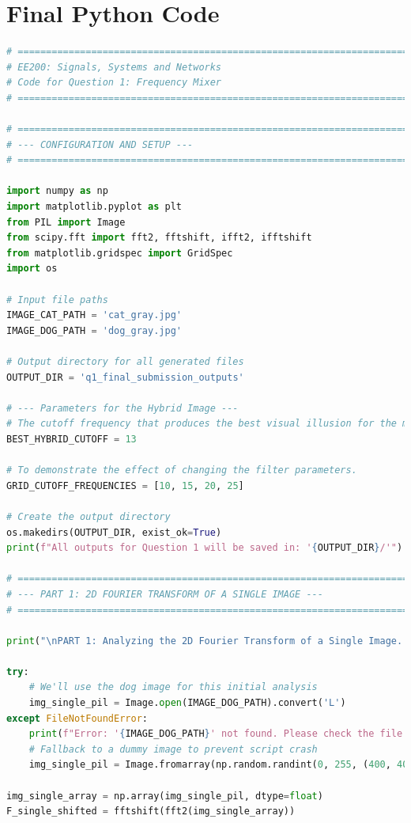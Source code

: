 \documentclass[11pt, a4paper]{article}
\begin{document}
\section{Final Python Code}
\begin{lstlisting}[language=Python, caption={Python script for Question 1.}]
# ============================================================================
# EE200: Signals, Systems and Networks
# Code for Question 1: Frequency Mixer
# ============================================================================

# ============================================================================
# --- CONFIGURATION AND SETUP ---
# ============================================================================

import numpy as np
import matplotlib.pyplot as plt
from PIL import Image
from scipy.fft import fft2, fftshift, ifft2, ifftshift
from matplotlib.gridspec import GridSpec
import os

# Input file paths
IMAGE_CAT_PATH = 'cat_gray.jpg'
IMAGE_DOG_PATH = 'dog_gray.jpg'

# Output directory for all generated files
OUTPUT_DIR = 'q1_final_submission_outputs'

# --- Parameters for the Hybrid Image ---
# The cutoff frequency that produces the best visual illusion for the main hybrid image.
BEST_HYBRID_CUTOFF = 13

# To demonstrate the effect of changing the filter parameters.
GRID_CUTOFF_FREQUENCIES = [10, 15, 20, 25]

# Create the output directory
os.makedirs(OUTPUT_DIR, exist_ok=True)
print(f"All outputs for Question 1 will be saved in: '{OUTPUT_DIR}/'")

# ============================================================================
# --- PART 1: 2D FOURIER TRANSFORM OF A SINGLE IMAGE ---
# ============================================================================

print("\nPART 1: Analyzing the 2D Fourier Transform of a Single Image...")

try:
    # We'll use the dog image for this initial analysis
    img_single_pil = Image.open(IMAGE_DOG_PATH).convert('L')
except FileNotFoundError:
    print(f"Error: '{IMAGE_DOG_PATH}' not found. Please check the file path.")
    # Fallback to a dummy image to prevent script crash
    img_single_pil = Image.fromarray(np.random.randint(0, 255, (400, 400), dtype=np.uint8))

img_single_array = np.array(img_single_pil, dtype=float)
F_single_shifted = fftshift(fft2(img_single_array))


\end{lstlisting}
\end{document}
